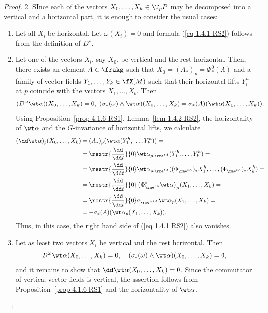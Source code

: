 \begin{proof}
    2. SInce each of the vectors $X_0,\ldots,X_k\in \T_pP$ may be decomposed into a vertical and a horizontal part, it is enough to consider the usual cases:
    \begin{enumerate}[label=(\alph*)]
        \item Let all $X_i$ be horizontal. Let $\omega(X_i)=0$ and formula (\ref{eq 1.4.1 RS2}) follows from the definition of $D^\omega$.
        \item Let one of the vectors $X_i$, say $X_0$, be vertical and the rest horizontal. Then, there exists an element $A\in\frakg$ such that $X_0=(A_\ast)_p=\Phi^0_\ast(A)$ and a family of vector fields $Y_1,\ldots,Y_k\in\fX(M)$ such that their horizontal lifts $Y_i^h$ at $p$ coincide with the vectors $X_1,\ldots,X_k$. Then
        \[(D^\omega\wt\alpha)(X_0,\ldots,X_k)=0,\; (\sigma_\ast(\omega)\wedge\wt\alpha)(X_0,\ldots,X_k)=\sigma_\ast(A)(\wt\alpha(X_1,\ldots,X_k)).\]
        Using Proposition~\ref{prop 4.1.6 RS1}, Lemma~\ref{lem 1.4.2 RS2}, the horizontality of $\wt\alpha$ and the $G$-invariance of horizontal lifts, we calculate
        \begin{align}
            (\dd\wt\alpha)_p(X_0,\ldots,X_k)&=(A_\ast)_p(\wt\alpha(Y_1^h,\ldots,Y_k^h))=\\
            &=\restr{\frac{\dd}{\dd t}}{0}\wt\alpha_{p\cdot \rme^{tA}}(Y_1^h,\ldots,Y_k^h)=\\
            &=\restr{\frac{\dd}{\dd t}}{0}\wt\alpha_{p\cdot \rme^{tA}}((\Phi_{\rme^{tA}})_\ast X_1^h,\ldots,(\Phi_{\rme^{tA}})_\ast X_k^h)=\\
            &=\restr{\frac{\dd}{\dd t}}{0}\left(\Phi_{\rme^{tA}}^\ast\wt\alpha\right)_p(X_1,\ldots,X_k)=\\
            &=\restr{\frac{\dd}{\dd t}}{0}\sigma_{\rme^{-tA}}\wt\alpha_p(X_1,\ldots,X_k)=\\
            &=-\sigma_\ast(A)(\wt\alpha_p(X_1,\ldots,X_k)).
        \end{align}
        Thus, in this case, the right hand side of (\ref{eq 1.4.1 RS2}) also vanishes.
        \item Let as least two vectors $X_i$ be vertical and the rest horizontal. Then
        \[D^\omega\wt\alpha(X_0,\ldots,X_k)=0,\quad (\sigma_\ast(\omega)\wedge \wt\alpha)(X_0,\ldots,X_k)=0,\]
        and it remains to show that $\dd\wt\alpha(X_0,\ldots,X_k)=0$. Since the commutator of vertical vector fields is vertical, the assertion follows from Proposition~\ref{prop 4.1.6 RS1} and the horizontality of $\wt\alpha$.
    \end{enumerate}
\end{proof}


